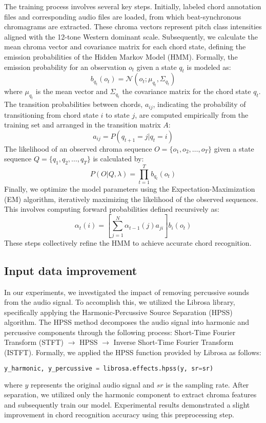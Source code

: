 \documentclass{article}
\begin{document}
The training process involves several key steps. Initially, labeled chord annotation files and corresponding audio files are loaded, from which beat-synchronous chromagrams are extracted. These chroma vectors represent pitch class intensities aligned with the 12-tone Western dominant scale. Subsequently, we calculate the mean chroma vector and covariance matrix for each chord state, defining the emission probabilities of the Hidden Markov Model (HMM). Formally, the emission probability for an observation $o_t$ given a state $q_t$ is modeled as:
\begin{equation}
b_{q_t}(o_t) = \mathcal{N}(o_t;\mu_{q_t}, \Sigma_{q_t})
\end{equation}
where $\mu_{q_t}$ is the mean vector and $\Sigma_{q_t}$ the covariance matrix for the chord state $q_t$. The transition probabilities between chords, $a_{ij}$, indicating the probability of transitioning from chord state $i$ to state $j$, are computed empirically from the training set and arranged in the transition matrix $A$:
\begin{equation}
a_{ij} = P(q_{t+1}=j|q_t=i)
\end{equation}
The likelihood of an observed chroma sequence $O = \{o_1, o_2, \dots, o_T\}$ given a state sequence $Q = \{q_1, q_2, \dots, q_T\}$ is calculated by:
\begin{equation}
P(O|Q,\lambda) = \prod_{t=1}^{T} b_{q_t}(o_t)
\end{equation}
Finally, we optimize the model parameters using the Expectation-Maximization (EM) algorithm, iteratively maximizing the likelihood of the observed sequences. This involves computing forward probabilities defined recursively as:
\begin{equation}
\alpha_t(i) = \left[\sum_{j=1}^{N}\alpha_{t-1}(j)a_{ji}\right] b_i(o_t)
\end{equation}
These steps collectively refine the HMM to achieve accurate chord recognition.

\subsection{Input data improvement}
In our experiments, we investigated the impact of removing percussive sounds from the audio signal. To accomplish this, we utilized the Librosa library, specifically applying the Harmonic-Percussive Source Separation (HPSS) algorithm. The HPSS method decomposes the audio signal into harmonic and percussive components through the following process: Short-Time Fourier Transform (STFT) $\rightarrow$ HPSS $\rightarrow$ Inverse Short-Time Fourier Transform (ISTFT). Formally, we applied the HPSS function provided by Librosa as follows:
\begin{lstlisting}[language=Python]
y_harmonic, y_percussive = librosa.effects.hpss(y, sr=sr)
\end{lstlisting}
where $y$ represents the original audio signal and $sr$ is the sampling rate. After separation, we utilized only the harmonic component to extract chroma features and subsequently train our model. Experimental results demonstrated a slight improvement in chord recognition accuracy using this preprocessing step.
\end{document}
